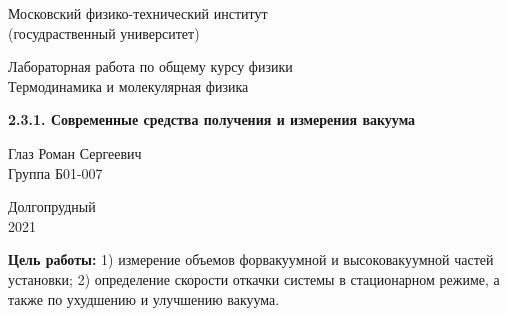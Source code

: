 \documentclass[a4paper, 12pt]{article} %
\begin{document}


\begin{titlepage}

    \newpage
    \begin{center}
        \normalsize Московский физико-технический институт \\(госудраственный университет)
    \end{center}

    \vspace{6em}

    \begin{center}
        \Large Лабораторная работа по общему курсу физики\\Термодинамика и молекулярная физика
    \end{center}

    \vspace{1em}

    \begin{center}
        \Large \textbf{2.3.1. Современные средства
получения и измерения вакуума}
    \end{center}

    \vspace{2em}

    \begin{center}
        \large Глаз Роман Сергеевич\\
        Группа Б01-007
    \end{center}

    \vspace{\fill}

    \begin{center}
        Долгопрудный \\2021
    \end{center}
    
\end{titlepage}



    \thispagestyle{empty}
    \newpage
    \tableofcontents
    \newpage
    \setcounter{page}{1}



\textbf{Цель работы:} 1) измерение объемов форвакуумной и высоковакуумной частей установки; 2) определение скорости откачки системы в стационарном режиме, а также по ухудшению и улучшению вакуума.\\
\end{document}
